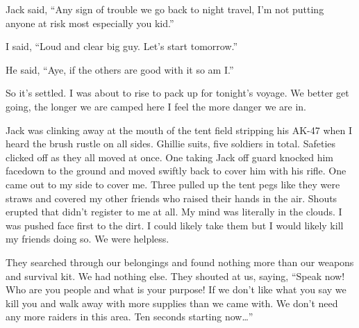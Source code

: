 Jack said, ``Any sign of trouble we go back to night travel, I'm not putting anyone at risk most especially you kid.''

I said, ``Loud and clear big guy. Let's start tomorrow.''

He said, ``Aye, if the others are good with it so am I.''

So it's settled. I was about to rise to pack up for tonight's voyage. We better get going, the longer we are camped here I feel the more danger we are in.

Jack was clinking away at the mouth of the tent field stripping his AK-47 when I heard the brush rustle on all sides. Ghillie suits, five soldiers in total. Safeties clicked off as they all moved at once. One taking Jack off guard knocked him facedown to the ground and moved swiftly back to cover him with his rifle. One came out to my side to cover me. Three pulled up the tent pegs like they were straws and covered my other friends who raised their hands in the air. Shouts erupted that didn't register to me at all. My mind was literally in the clouds. I was pushed face first to the dirt. I could likely take them but I would likely kill my friends doing so. We were helpless.

They searched through our belongings and found nothing more than our weapons and survival kit. We had nothing else. They shouted at us, saying, ``Speak now! Who are you people and what is your purpose! If we don't like what you say we kill you and walk away with more supplies than we came with. We don't need any more raiders in this area. Ten seconds starting now\dots''

